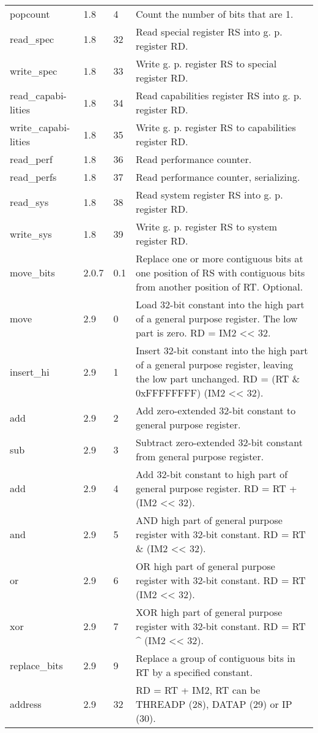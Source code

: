 \documentclass[forwardcom.tex]{subfiles}
\begin{document}
\begin{longtable} {|p{25mm}|p{12mm}|p{12mm}|p{95mm}|}
popcount      & 1.8   &  4 & Count the number of bits that are 1.\\
read\_spec    & 1.8   & 32  & Read special register RS into g. p. register RD. \\
write\_spec   & 1.8   & 33  & Write g. p. register RS to special register RD. \\
read\_capabi-lities & 1.8   & 34  & Read capabilities register RS into g. p. register RD. \\
write\_capabi-lities & 1.8   & 35  & Write g. p. register RS to capabilities register RD. \\
read\_perf    & 1.8   & 36  & Read performance counter. \\
read\_perfs   & 1.8   & 37  & Read performance counter, serializing. \\
read\_sys     & 1.8   & 38  & Read system register RS into g. p. register RD. \\
write\_sys    & 1.8   & 39  & Write g. p. register RS to system register RD. \\

move\_bits    & 2.0.7 & 0.1 & Replace one or more contiguous bits at one position of RS with contiguous bits from another position of RT. Optional. \\

move          & 2.9   &  0  & Load 32-bit constant into the high part of a general purpose register. The low part is zero. RD = IM2 \textless\textless{} 32. \\
insert\_hi    & 2.9   &  1  & Insert 32-bit constant into the high part of a general purpose register, leaving the low part unchanged.
RD = (RT \& 0xFFFFFFFF) \textbar{} (IM2 \textless\textless{} 32). \\
add           & 2.9   &  2  & Add zero-extended 32-bit constant to general purpose register. \\
sub           & 2.9   &  3  & Subtract zero-extended 32-bit constant from general purpose register. \\
add           & 2.9   &  4  & Add 32-bit constant to high part of general purpose register. RD = RT + (IM2 \textless\textless{} 32). \\
and           & 2.9   &  5  & AND high part of general purpose register with 32-bit constant. RD = RT \& (IM2 \textless\textless{} 32). \\
or            & 2.9   &  6  & OR high part of general purpose register with 32-bit constant. RD = RT \textbar{} (IM2 \textless\textless{} 32). \\
xor           & 2.9   &  7  & XOR high part of general purpose register with 32-bit constant. RD = RT \^{} (IM2 \textless\textless{} 32). \\
replace\_bits & 2.9   &  9  & Replace a group of contiguous bits in RT by a specified constant. \\
address       & 2.9   & 32  & RD = RT + IM2, RT can be THREADP (28), DATAP (29) or IP (30). \\
\hline
\end{longtable}
\end{document}
